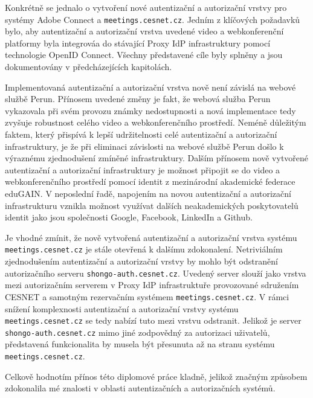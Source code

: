 \documentclass[
  printed, %
  twoside, %
  table,   %
  nolof,     %
  nolot,     %
]{fithesis3}
\begin{document}
\par 

Konkrétně se jednalo o vytvoření nové autentizační a autorizační vrstvy pro systémy Adobe Connect a \texttt{meetings.cesnet.cz}. Jedním z klíčových požadavků bylo, aby autentizační a autorizační vrstva uvedené video a webkonferenční platformy byla integrováa do stávající Proxy IdP infrastruktury pomocí technologie OpenID Connect. Všechny představené cíle byly splněny a jsou dokumentovány v předcházejících kapitolách. 

\par
Implementovaná autentizační a autorizační vrstva nově není závislá na webové službě Perun. Přínosem uvedené změny je fakt, že webová služba Perun vykazovala při svém provozu známky nedostupnosti a nová implementace tedy zvyšuje robustnost celého video a webkonferenčního prostředí. Neméně důležitým faktem, který přispívá k lepší udržitelnosti celé autentizační a autorizační infrastruktury, je že při eliminaci závislosti na webové službě Perun došlo k výraznému zjednodušení zmíněné infrastruktury. Dalším přínosem nově vytvořené autentizační a autorizační infrastruktury je možnost připojit se do video a webkonferenčního prostředí pomocí identit z mezinárodní akademické federace eduGAIN. V neposlední řadě, napojením na novou autentizační a autorizační infrastrukturu vznikla možnost využívat dalších neakademických poskytovatelů identit jako jsou společnosti Google, Facebook, LinkedIn a Github. 

\par

Je vhodné zmínit, že nově vytvořená autentizační a autorizační vrstva systému \texttt{meetings.cesnet.cz} je stále otevřená k dalšímu zdokonalení. Netriviálním zjednodušením autentizační a autorizační vrstvy by mohlo být odstranění autorizačního serveru \texttt{shongo-auth.cesnet.cz}. Uvedený server slouží jako vrstva mezi autorizačním serverem v Proxy IdP infrastruktuře provozované sdružením CESNET a samotným rezervačním systémem \texttt{meetings.cesnet.cz}. V rámci snížení komplexnosti autentizační a autorizační vrstvy systému \texttt{meetings.cesnet.cz} se tedy nabízí tuto mezi vrstvu odstranit. Jelikož je server \texttt{shongo-auth.cesnet.cz} mimo jiné zodpovědný za autorizaci uživatelů, představená funkcionalita by musela být přesunuta až na stranu systému \texttt{meetings.cesnet.cz}. 

\par 

Celkově hodnotím přínos této diplomové práce kladně, jelikož značným způsobem zdokonalila mé znalosti v oblasti autentizačních a autorizačních systémů.
\end{document}
